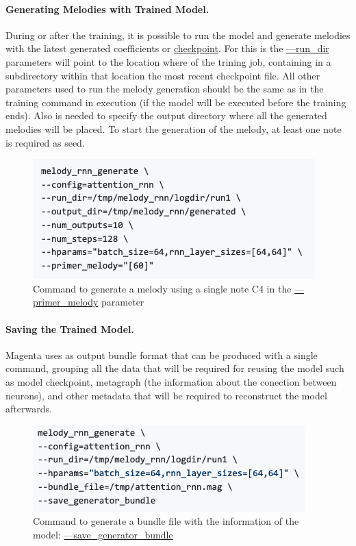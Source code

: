 \paragraph{Generating Melodies with Trained Model.} During or after the training, it is
possible to run the model and generate melodies with the latest generated coefficients or
\url{checkpoint}. For this is the \url{—run_dir} parameters will point to the location
where of the trining job, containing in a subdirectory within that location the most
recent checkpoint file. All other parameters used to run the melody generation should be
the same as in the training command in execution (if the model will be executed before the
training ends). Also is needed to specify the output directory where all the generated
melodies will be placed. To start the generation of the melody, at least one note is
required as seed.

\begin{figure}[h!]
  \includegraphics[width=\linewidth]{image/fig_JDF08.png}
  \caption{Command to generate a melody using a single note C4 in the \url{—primer_melody} parameter}
\end{figure}


\paragraph{Saving the Trained Model.} Magenta uses as output bundle format that can be
produced with a single command, grouping all the data that will be required for reusing
the model such as model checkpoint, metagraph (the information about the conection
between neurons), and other metadata that will be required to reconstruct the model
afterwards.

\begin{figure}[h!]
  \includegraphics[width=\linewidth]{image/fig_JDF09.png}
  \caption{Command to generate a bundle file with the information of the model: \url{—save_generator_bundle}}
\end{figure}

